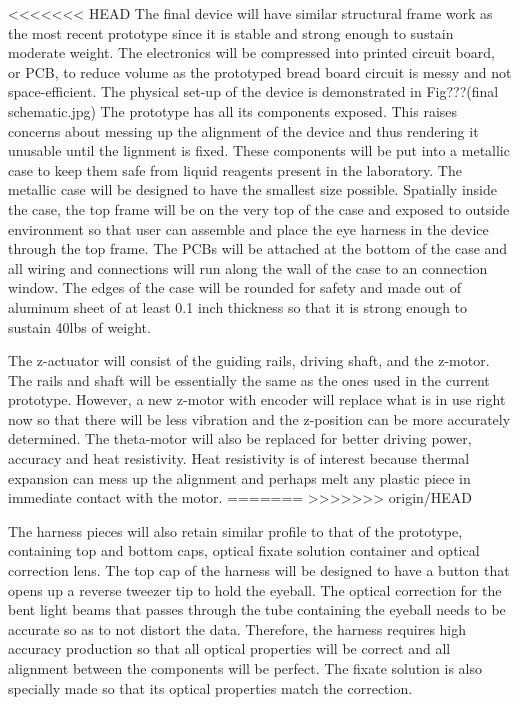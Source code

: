 \documentclass{article}
\begin{document}
<<<<<<< HEAD
The final device will have similar structural frame work as the most recent prototype since it is stable and 
strong enough to sustain moderate weight. The electronics will be compressed into printed circuit board, or 
PCB, to reduce volume as the prototyped bread board circuit is messy and not space-efficient. The 
physical set-up of the device is demonstrated in Fig???(final schematic.jpg) The prototype has all its 
components exposed. This raises concerns about messing up the alignment of the device and thus 
rendering it unusable until the lignment is fixed. These components will be put into a metallic case to keep 
them safe from liquid reagents present in the laboratory. The metallic case will be designed to have the 
smallest size possible. Spatially inside the case, the top frame will be on the very top of the case and 
exposed to outside environment so that user can assemble and place the eye harness in the device 
through the top frame. The PCBs will be attached at the bottom of the case and all wiring and connections 
will run along the wall of the case to an connection window. The edges of the case will be rounded for 
safety and made out of aluminum sheet of at least 0.1 inch thickness so that it is strong enough to sustain 
40lbs of weight. 

The z-actuator will consist of the guiding rails, driving shaft, and the z-motor. The rails and shaft will be essentially the same as the ones used in the current prototype. However, a new z-motor with encoder will replace what is in use right now so that there will be less vibration and the z-position can be more accurately determined. The theta-motor will also be replaced for better driving power, accuracy and heat resistivity. Heat resistivity is of interest because thermal expansion can mess up the alignment and perhaps melt any plastic piece in immediate contact with the motor.
=======
>>>>>>> origin/HEAD

The harness pieces will also retain similar profile to that of the prototype, containing top and bottom caps, optical fixate solution container and optical correction lens. The top cap of the harness will be designed to have a button that opens up a reverse tweezer tip to hold the eyeball. The optical correction for the bent light beams that passes through the tube containing the eyeball needs to be accurate so as to not distort the data. Therefore, the harness requires high accuracy production so that all optical properties will be correct and all alignment between the components will be perfect. The fixate solution is also specially made so that its optical properties match the correction.
\end{document}
